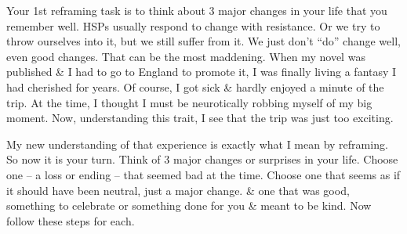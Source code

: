 \documentclass{article}
\numberwithin{equation}{section}
\begin{document}
Your 1st reframing task is to think about 3 major changes in your life that you remember well. HSPs usually respond to change with resistance. Or we try to throw ourselves into it, but we still suffer from it. We just don't ``do'' change well, even good changes. That can be the most maddening. When my novel was published \& I had to go to England to promote it, I was finally living a fantasy I had cherished for years. Of course, I got sick \& hardly enjoyed a minute of the trip. At the time, I thought I must be neurotically robbing myself of my big moment. Now, understanding this trait, I see that the trip was just too exciting.

My new understanding of that experience is exactly what I mean by reframing. So now it is your turn. Think of 3 major changes or surprises in your life. Choose one -- a loss or ending -- that seemed bad at the time. Choose one that seems as if it should have been neutral, just a major change. \& one that was good, something to celebrate or something done for you \& meant to be kind. Now follow these steps for each.
\end{document}
